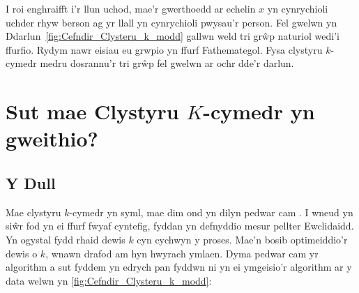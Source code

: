 I roi enghraifft i'r llun uchod, mae'r gwerthoedd ar echelin $x$ yn cynrychioli uchder rhyw berson ag yr llall yn cynrychioli pwysau'r person. Fel gwelwn yn Ddarlun~\ref{fig:Cefndir_Clysteru_k_modd} gallwn weld tri gr\^{w}p naturiol wedi'i ffurfio. Rydym nawr eisiau eu grwpio yn ffurf Fathemategol. Fysa clystyru $k$-cymedr medru dosrannu'r tri gr\^{w}p fel gwelwn ar ochr dde'r darlun. 


\section{Sut mae Clystyru $K$-cymedr yn gweithio?}

\subsection{Y Dull}

Mae clystyru $k$-cymedr yn syml, mae dim ond yn dilyn pedwar cam \cite{K-means-clustering}. I wneud yn si\^{w}r fod yn ei ffurf fwyaf cyntefig, fyddan yn defnyddio mesur pellter Ewclidaidd. Yn ogystal fydd rhaid dewis $k$ cyn cychwyn y proses. Mae'n bosib optimeiddio'r dewis o $k$, wnawn drafod am hyn hwyrach ymlaen. Dyma pedwar cam yr algorithm a sut fyddem yn edrych pan fyddwn ni yn ei ymgeisio'r algorithm ar y data welwn yn \ref{fig:Cefndir_Clysteru_k_modd}:

